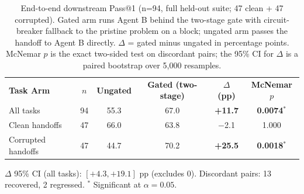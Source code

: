 \begin{table}[t]
\centering
\small
\caption{End-to-end downstream Pass@1 (n=94, full held-out suite; 47 clean + 47 corrupted). Gated arm runs Agent B behind the two-stage gate with circuit-breaker fallback to the pristine problem on a block; ungated arm passes the handoff to Agent B directly. $\Delta$ = gated minus ungated in percentage points. McNemar $p$ is the exact two-sided test on discordant pairs; the 95\% CI for $\Delta$ is a paired bootstrap over 5{,}000 resamples.}
\label{tab:downstream_overall}
\begin{tabular}{lccccc}
\toprule
\multirow{2}{*}{\textbf{Task Arm}} & \multirow{2}{*}{\textbf{$n$}} & \multirow{2}{*}{\textbf{Ungated}} & \multirow{2}{*}{\textbf{Gated (two-stage)}} & \multirow{2}{*}{\textbf{$\Delta$ (pp)}} & \multirow{2}{*}{\textbf{McNemar $p$}} \\
 & & & & & \\
\midrule
All tasks & 94 & 55.3 & 67.0 & \textbf{+11.7} & \textbf{0.0074}$^{*}$ \\
Clean handoffs & 47 & 66.0 & 63.8 & $-$2.1 & 1.000 \\
Corrupted handoffs & 47 & 44.7 & 70.2 & \textbf{+25.5} & \textbf{0.0018}$^{*}$ \\
\bottomrule
\end{tabular}
\vspace{-2pt}
\begin{flushleft}\small
$\Delta$ 95\% CI (all tasks): $[+4.3, +19.1]$ pp (excludes 0). Discordant pairs: 13 recovered, 2 regressed. $^{*}$ Significant at $\alpha=0.05$.
\end{flushleft}
\end{table}